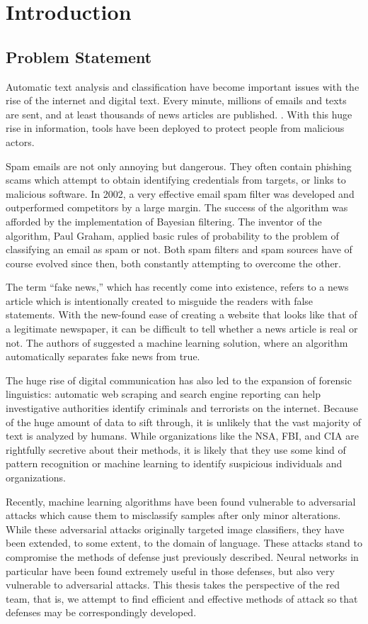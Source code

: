 \chapter{Introduction}
\section{Problem Statement}
Automatic text analysis and classification have become important issues with the rise of the internet and digital text.  Every minute, millions of emails and texts are sent, and at least thousands of news articles are published. \cite{jj17,mr16}.  With this huge rise in information, tools have been deployed to protect people from malicious actors. 

Spam emails are not only annoying but dangerous.  They often contain phishing scams which attempt to obtain identifying credentials from targets, or links to malicious software.  In 2002, a very effective email spam filter was developed and outperformed competitors by a large margin. \cite{bl02} The success of the algorithm was afforded by the implementation of Bayesian filtering.  The inventor of the algorithm, Paul Graham, applied basic rules of probability to the problem of classifying an email as spam or not.  Both spam filters and spam sources have of course evolved since then, both constantly attempting to overcome the other.

The term ``fake news,'' which has recently come into existence, refers to a news article which is intentionally created to misguide the readers with false statements.  With the new-found ease of creating a website that looks like that of a legitimate newspaper, it can be difficult to tell whether a news article is real or not.  The authors of \cite{nr17} suggested a machine learning solution, where an algorithm automatically separates fake news from true.

The huge rise of digital communication has also led to the expansion of forensic linguistics: automatic web scraping and search engine reporting can help investigative authorities identify criminals and terrorists on the internet.  Because of the huge amount of data to sift through, it is unlikely that the vast majority of text is analyzed by humans.  While organizations like the NSA, FBI, and CIA are rightfully secretive about their methods, it is likely that they use some kind of pattern recognition or machine learning to identify suspicious individuals and organizations.

Recently, machine learning algorithms have been found vulnerable to adversarial attacks which cause them to misclassify samples after only minor alterations. \cite{cs14} While these adversarial attacks originally targeted image classifiers, they have been extended, to some extent, to the domain of language. \cite{np16} These attacks stand to compromise the methods of defense just previously described.  Neural networks in particular have been found extremely useful in those defenses, but also very vulnerable to adversarial attacks.  This thesis takes the perspective of the red team, that is, we attempt to find efficient and effective methods of attack so that defenses may be correspondingly developed.

